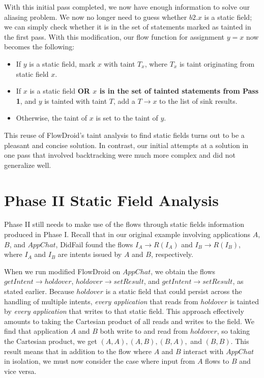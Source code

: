 With this initial pass completed, we now have enough information to solve our aliasing problem. We now no longer need to guess whether $\mathit{b2}.x$ is a static field; we can simply check whether it is in the set of statements marked as tainted in the first pass. With this modification, our flow function for assignment $y = x$ now becomes the following:

\begin{itemize}
\item If $y$ is a static field, mark $x$ with taint $T_x$, where $T_x$ is taint originating from static field $x$.
\item If $x$ is a static field \textbf{OR $x$ is in the set of tainted statements from Pass 1}, and $y$ is tainted with taint $T$, add a $T\rightarrow x$ to the list of sink results.
\item Otherwise, the taint of $x$ is set to the taint of $y$.
\end{itemize}

This reuse of FlowDroid's taint analysis to find static fields turns out to be a pleasant and concise solution. In contrast, our initial attempts at a solution in one pass that involved backtracking were much more complex and did not generalize well.

\section{Phase II Static Field Analysis}
\label{sec:staticphase2}

Phase II still needs to make use of the flows through static fields information produced in Phase I. Recall that in our original example involving applications $A$, $B$, and $AppChat$, DidFail found the flows $I_A\rightarrow R(I_A)$ and $I_B\rightarrow R(I_B)$, where $I_A$ and $I_B$ are intents issued by $A$ and $B$, respectively. 

When we run modified FlowDroid on $AppChat$, we obtain the flows $getIntent\rightarrow holdover$, $holdover\rightarrow setResult$, and $getIntent\rightarrow setResult$, as stated earlier. Because $holdover$ is a static field that could persist across the handling of multiple intents, \emph{every application} that reads from $holdover$ is tainted by \emph{every application} that writes to that static field. This approach effectively amounts to taking the Cartesian product of all reads and writes to the field. We find that application $A$ and $B$ both write to and read from $holdover$, so taking the Cartesian product, we get $(A, A), (A, B), (B, A),$ and $(B, B)$. This result means that in addition to the flow where $A$ and $B$ interact with $AppChat$ in isolation, we must now consider the case where input from $A$ flows to $B$ and vice versa.

